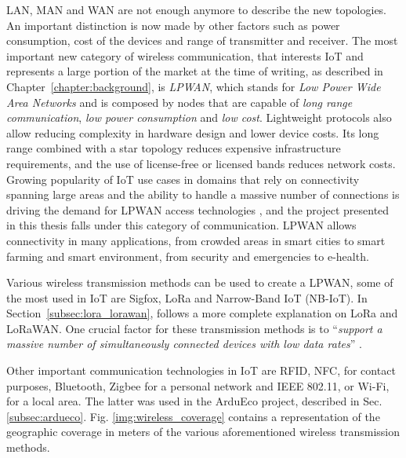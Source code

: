 		LAN, MAN and WAN are not enough anymore to describe the new topologies.
		An important distinction is now made by other factors such as power consumption, cost of the devices and range of transmitter and receiver.	
		The most important new category of wireless communication, that interests IoT and represents a large portion of the market at the time of writing, as described in Chapter~\ref{chapter:background}, is \textit{LPWAN}, which stands for \textit{Low Power Wide Area Networks} and is composed by nodes that are capable of \textit{long range communication}, \textit{low power consumption} and \textit{low cost}.
		Lightweight protocols also allow reducing complexity in hardware design and lower device costs.
		Its long range combined with a star topology reduces expensive infrastructure requirements, and the use of license-free or licensed bands reduces network costs.
		Growing popularity of IoT use cases in domains that rely on connectivity spanning large areas and the ability to handle a massive number of connections is driving the demand for LPWAN access technologies \cite{fi12030046}, and the project presented in this thesis falls under this category of communication.
		LPWAN allows connectivity in many applications, from crowded areas in smart cities to smart farming and smart environment, from security and emergencies to e-health.
		
		Various wireless transmission methods can be used to create a LPWAN, some of the most used in IoT are Sigfox, LoRa and Narrow-Band IoT (NB-IoT).
		In Section~\ref{subsec:lora_lorawan}, follows a more complete explanation on LoRa and LoRaWAN.
		One crucial factor for these transmission methods is to ``\textit{support a massive number of simultaneously connected devices with low data rates}'' \cite{fi12030046}.
		
		Other important communication technologies in IoT are RFID, NFC, for contact purposes, Bluetooth, Zigbee for a personal network and IEEE 802.11, or Wi-Fi, for a local area.
		The latter was used in the ArduEco project, described in Sec. \ref{subsec:ardueco}.
		Fig. \ref{img:wireless_coverage} contains a representation of the geographic coverage in meters of the various aforementioned wireless transmission methods.
	
